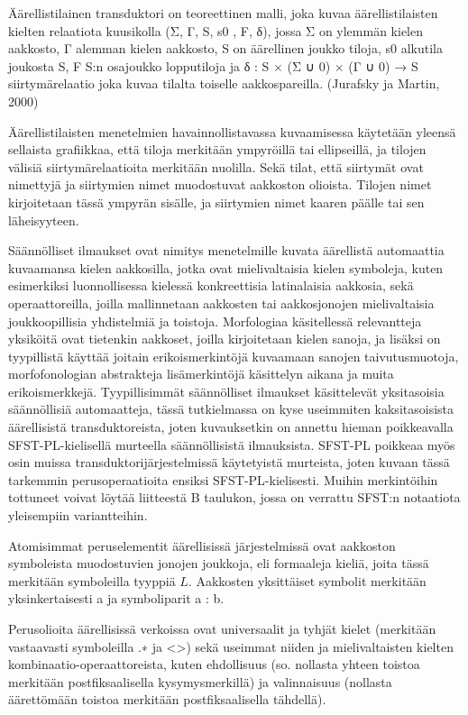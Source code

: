 \documentclass[free]{flammie}
\begin{document}
Äärellistilainen transduktori on teoreettinen malli, joka kuvaa äärellistilaisten
kielten relaatiota kuusikolla (Σ, Γ, S, s0 , F, δ), jossa Σ on ylemmän kielen aakkosto, Γ alemman kielen aakkosto, S on äärellinen joukko tiloja, s0 alkutila joukosta
S, F S:n osajoukko lopputiloja ja δ : S × (Σ ∪ 0) × (Γ ∪ 0) → S siirtymärelaatio
joka kuvaa tilalta toiselle aakkospareilla. (Jurafsky ja Martin, 2000)

Äärellistilaisten menetelmien havainnollistavassa kuvaamisessa käytetään yleensä
sellaista grafiikkaa, että tiloja merkitään ympyröillä tai ellipseillä, ja tilojen välisiä
siirtymärelaatioita merkitään nuolilla. Sekä tilat, että siirtymät ovat nimettyjä ja
siirtymien nimet muodostuvat aakkoston olioista. Tilojen nimet kirjoitetaan tässä
ympyrän sisälle, ja siirtymien nimet kaaren päälle tai sen läheisyyteen.

Säännölliset ilmaukset ovat nimitys menetelmille kuvata äärellistä automaattia
kuvaamansa kielen aakkosilla, jotka ovat mielivaltaisia kielen symboleja, kuten
esimerkiksi luonnollisessa kielessä konkreettisia latinalaisia aakkosia, sekä operaattoreilla, joilla mallinnetaan aakkosten tai aakkosjonojen mielivaltaisia joukkoopillisia yhdistelmiä ja toistoja. Morfologiaa käsitellessä relevantteja yksiköitä
ovat tietenkin aakkoset, joilla kirjoitetaan kielen sanoja, ja lisäksi on tyypillistä
käyttää joitain erikoismerkintöjä kuvaamaan sanojen taivutusmuotoja, morfofonologian abstrakteja lisämerkintöjä käsittelyn aikana ja muita erikoismerkkejä. Tyypillisimmät säännölliset ilmaukset käsittelevät yksitasoisia säännöllisiä automaatteja, tässä tutkielmassa on kyse useimmiten kaksitasoisista äärellisistä transduktoreista, joten kuvauksetkin on annettu hieman poikkeavalla SFST-PL-kielisellä
murteella säännöllisistä ilmauksista. SFST-PL poikkeaa myös osin muissa transduktorijärjestelmissä käytetyistä murteista, joten kuvaan tässä tarkemmin perusoperaatioita ensiksi SFST-PL-kielisesti. Muihin merkintöihin tottuneet voivat löytää liitteestä B taulukon, jossa on verrattu SFST:n notaatiota yleisempiin variantteihin.

Atomisimmat peruselementit äärellisissä järjestelmissä ovat aakkoston symboleista muodostuvien jonojen joukkoja, eli formaaleja kieliä, joita tässä merkitään symboleilla tyyppiä $L$. Aakkosten yksittäiset symbolit merkitään yksinkertaisesti a
ja symboliparit a : b.

Perusolioita äärellisissä verkoissa ovat universaalit ja tyhjät kielet (merkitään vastaavasti symboleilla .∗ ja <>) sekä useimmat niiden ja mielivaltaisten kielten
kombinaatio-operaattoreista, kuten ehdollisuus (so. nollasta yhteen toistoa merkitään postfiksaalisella kysymysmerkillä) ja valinnaisuus (nollasta äärettömään toistoa merkitään postfiksaalisella tähdellä).
\end{document}
